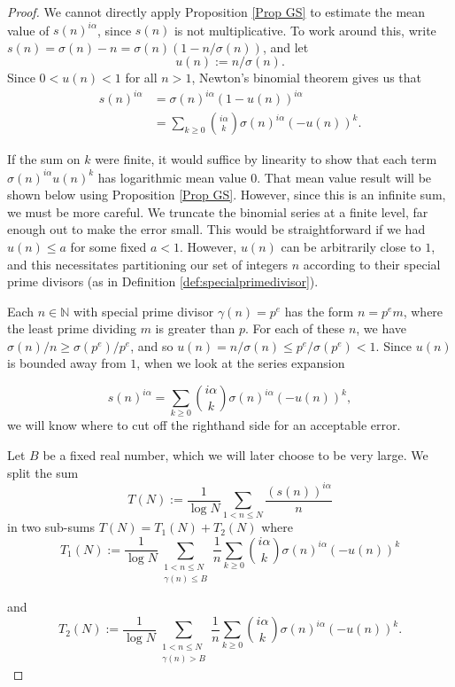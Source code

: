\documentclass[11pt, reqno]{amsart}
\theoremstyle{remark}
\numberwithin{theorem}{section}
\numberwithin{proposition}{section}
\numberwithin{lemma}{section}
\numberwithin{corollary}{section}
\numberwithin{equation}{section}
\numberwithin{conjecture}{section}
\numberwithin{definition}{section}
\begin{document}
\begin{proof} We cannot directly apply Proposition \ref{Prop GS} to estimate the mean value of $s(n)^{i\alpha}$, since $s(n)$ is not multiplicative. To work around this, write $s(n) = \sigma(n) - n = \sigma(n) (1-n/\sigma(n))$, and let \[ u(n):= n/\sigma(n).\] Since $0 < u(n)<1$ for all $n>1$,  Newton's binomial theorem gives us that
\begin{align*} s(n)^{i \alpha} &= \sigma(n)^{i\alpha}(1 - u(n))^{i\alpha} \\ &= \sum_{k \geq 0} \binom{i\alpha}{k} \sigma(n)^{i\alpha} (-u(n))^k.\end{align*}

If the sum on $k$ were finite, it would suffice by linearity to show that each term $\sigma(n)^{i\alpha} u(n)^k$ has logarithmic mean value $0$. That mean value result will be shown below using Proposition \ref{Prop GS}. However, since this is an infinite sum, we must be more careful. We truncate the binomial series at a finite level, far enough out to make the error small. This would be straightforward if we had $u(n) \leq a$ for some fixed $a< 1$. However, $u(n)$ can be arbitrarily close to $1$, and this necessitates partitioning our set of integers $n$ according to their special prime divisors (as in Definition \ref{def:specialprimedivisor}).



Each $n\in\mathbb{N}$ with special prime divisor $\gamma (n)=p^e$ has the form $n = p^em$, where the least prime dividing $m$ is greater than $p$. For each of these $n$, we have $\sigma(n)/n\geq \sigma(p^e)/p^e$, and so $u(n) = n/\sigma(n) \leq p^e/\sigma(p^e) < 1$. Since $u(n)$ is bounded away from $1$, when we look at the series expansion
	
$$	s(n)^{i\alpha} = \sum_{k \geq 0} \binom{i\alpha}{k}\sigma(n)^{i\alpha} (-u(n))^{k},$$ 
we will know where to cut off the righthand side for an acceptable error. 
 
Let $B$ be a fixed real number, which we will later choose to be very large.
We split the sum 
\[
T(N):=\frac{1}{\log N}
\sum_{1< n\le N}
\frac{(s(n))^{i\alpha}}{n}
\]
in two sub-sums $T(N)=T_1 (N)+T_2 (N)$ where 
\[T_1 (N)
:= \frac{1}{\log N}\sum_{\substack{{1<n\leq N}\\
{\gamma (n)\le B}}}\frac{1}{n}\sum_{k \geq 0} \binom{i\alpha}{k}\sigma(n)^{i\alpha} (-u(n))^{k}\]


and 
\[T_2 (N)
:= \frac{1}{\log N}\sum_{\substack{{1<n\leq N}\\
{\gamma (n)> B}}}\frac{1}{n}\sum_{k \geq 0} \binom{i\alpha}{k}\sigma(n)^{i\alpha} (-u(n))^{k}.\]




\end{proof}
\end{document}

